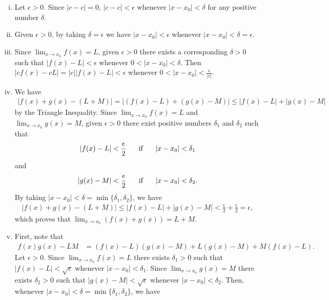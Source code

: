\documentclass[12pt,letterpaper,reqno]{article}
\numberwithin{equation}{section}
\begin{document}
{\begin{pf}
\begin{enumerate}[(i)]
	\item Let $\epsilon>0$. Since $|c-c|=0$, $|c-c|<\epsilon$ whenever $|x-x_0|<\delta$ for any positive number $\delta$.
	\item Given $\epsilon>0$, by taking $\delta=\epsilon$ we have $|x-x_0|<\epsilon$ whenever $|x-x_0|<\delta=\epsilon$.
	\item Since $\lim_{x \to x_0}f(x)=L$, given $\epsilon>0$ there exists a corresponding $\delta>0$ such that $|f(x)-L|<\epsilon$ whenever $0<|x-x_0|<\delta$. Then $|cf(x)-cL|=|c||f(x)-L|<\epsilon$ whenever $0<|x-x_0|<\frac{\epsilon}{|c|}$.
	\item We have
	\begin{align*}
		|f(x)+g(x)-(L+M)|=|(f(x)-L)+(g(x)-M)| \leq |f(x)-L|+|g(x)-M|
	\end{align*}
	by the Triangle Inequality. Since $\lim_{x \to x_0}f(x)=L$ and $\lim_{x \to x_0}g(x)=M$, given $\epsilon>0$ there exist positive numbers $\delta_1$ and $\delta_2$ such that 
	\begin{align*}
		|f(x)-L|<\frac{\epsilon}{2} \hspace{0.5cm} \text{ if } \hspace{0.5cm} |x-x_0|<\delta_1
	\end{align*} 
	and 
	\begin{align*}
		|g(x)-M|<\frac{\epsilon}{2} \hspace{0.5cm} \text{ if } \hspace{0.5cm} |x-x_0|<\delta_2.
	\end{align*} 
	By taking $|x-x_0|<\delta=\min\{\delta_1,\delta_2\}$, we have 
	\begin{align*}
		|f(x)+g(x)-(L+M)|\leq |f(x)-L|+|g(x)-M|<\frac{\epsilon}{2}+\frac{\epsilon}{2}=\epsilon,
	\end{align*}
	which proves that $\lim_{x \to x_0}(f(x)+g(x))=L+M$.
	\item First, note that
		\begin{align*}
			f(x)g(x)-LM&=(f(x)-L)(g(x)-M)+L(g(x)-M)+M(f(x)-L).
		\end{align*} 
		Let $\epsilon>0$. Since $\lim_{x \to x_0}f(x)=L$ there exists $\delta_1>0$ such that $|f(x)-L|<\sqrt{\epsilon}$ whenever $|x-x_0|<\delta_1$. Since $\lim_{x \to x_0}g(x)=M$ there exists $\delta_2>0$ such that $|g(x)-M|<\sqrt{\epsilon}$ whenever $|x-x_0|<\delta_2$. Then, whenever $|x-x_0|<\delta=\min\{\delta_1,\delta_2\}$, we have
		\begin{align*}

\end{align*}
\end{enumerate}
\end{pf}}
\end{document}

